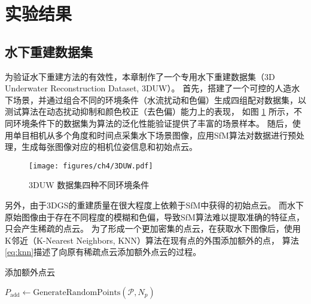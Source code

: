 \section{实验结果}
\subsection{水下重建数据集}
为验证水下重建方法的有效性，本章制作了一个专用水下重建数据集（3D Underwater Reconstruction Dataset, 3DUW）。
首先，搭建了一个可控的人造水下场景，并通过组合不同的环境条件（水流扰动和色偏）生成四组配对数据集，以测试算法在动态扰动抑制和颜色校正（去色偏）能力上的表现，
如图 \ref{img:3DUW} 所示，不同环境条件下的数据集为算法的泛化性能验证提供了丰富的场景样本。
随后，使用单目相机从多个角度和时间点采集水下场景图像，应用SfM算法\cite{sfm1}\cite{sfm2}对数据进行预处理，生成每张图像对应的相机位姿信息和初始点云。
\begin{figure}
    \centering
    \texttt{[image: figures/ch4/3DUW.pdf]}
    \caption{3DUW 数据集四种不同环境条件}
    \label{img:3DUW}
\end{figure}

另外，由于3DGS的重建质量在很大程度上依赖于SfM中获得的初始点云。
而水下原始图像由于存在不同程度的模糊和色偏，导致SfM算法难以提取准确的特征点，只会产生稀疏的点云。
为了形成一个更加密集的点云，在获取水下图像后，使用K邻近（K-Nearest Neighbors, KNN）算法在现有点的外围添加额外的点，
算法\ref{eq:knn}描述了向原有稀疏点云添加额外点云的过程。
\begin{algorithm}[t]
    \caption{\label{eq:knn}添加额外点云}
    
    $P_\text{add} \leftarrow \text{GenerateRandomPoints}(\mathcal{P}, N_p)$
    
\end{algorithm}

